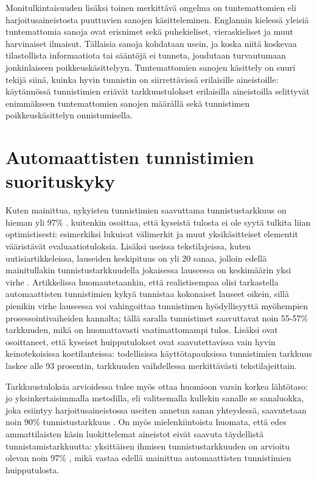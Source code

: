 \documentclass[utf8,bachelor,manualbib]{gradu3}
\begin{document}
Monitulkintaisuuden lisäksi toinen merkittävä ongelma on tuntemattomien eli harjoitusaineistosta puuttuvien sanojen käsitteleminen. Englannin kielessä yleisiä tuntemattomia sanoja ovat erisnimet sekä puhekieliset, vieraskieliset ja muut harvinaiset ilmaisut. Tällaisia sanoja kohdataan usein, ja koska niitä koskevaa tilastollista informaatiota tai sääntöjä ei tunneta, joudutaan turvautumaan jonkinlaiseen poikkeuskäsittelyyn. Tuntemattomien sanojen käsittely on suuri tekijä siinä, kuinka hyvin tunnistin on siirrettävissä erilaisille aineistoille: käytännössä tunnistimien eriävät tarkkuustulokset erilaisilla aineistoilla selittyvät enimmäkseen tuntemattomien sanojen määrällä sekä tunnistimen poikkeuskäsittelyn onnistumisella. \citep[s. 351]{manning1999}  

\section{Automaattisten tunnistimien suorituskyky}

Kuten mainittua, nykyisten tunnistimien saavuttama tunnistustarkkuus on hieman yli 97\%  \citep[mm.][]{spoustova2009, sogaard2011}. \citet{manning2011} kuitenkin osoittaa, että kyseistä tulosta ei ole syytä tulkita liian optimistisesti: esimerkiksi lukuisat välimerkit ja muut yksikäsitteiset elementit vääristävät evaluaatiotuloksia. Lisäksi useissa tekstilajeissa, kuten uutisiartikkeleissa, lauseiden keskipituus on yli 20 sanaa, jolloin edellä mainitullakin tunnistustarkkuudella jokaisessa lauseessa on keskimäärin yksi virhe \citep{manning1999}. Artikkelissa huomautetaankin, että realistisempaa olisi tarkastella automaattisten tunnistimien kykyä tunnistaa kokonaiset lauseet oikein, sillä pienikin virhe lauseessa voi vahingoittaa tunnistimen hyödyllisyyttä myöhempien prosessointivaiheiden kannalta; tällä saralla tunnistimet saavuttavat noin 55-57\% tarkkuuden, mikä on huomattavasti vaatimattomampi tulos. Lisäksi  ovat osoittaneet, että kyseiset huipputulokset ovat saavutettavissa vain hyvin keinotekoisissa koetilanteissa: todellisissa käyttötapauksissa tunnistimien tarkkuus laskee alle 93 prosentin, tarkkuuden vaihdellessa merkittävästi tekstilajeittain.

Tarkkuustuloksia arvioidessa tulee myös ottaa huomioon varsin korkea lähtötaso: jo yksinkertaisimmalla metodilla, eli valitsemalla kullekin sanalle se sanaluokka, joka esiintyy harjoitusaineistossa useiten annetun sanan yhteydessä, saavutetaan noin 90\% tunnistustarkkuus \citep{charniak1993}. On myös mielenkiintoista huomata, että edes ammattilaisten käsin luokittelemat aineistot eivät saavuta täydellistä tunnistamistarkkuutta: yksittäisen ihmisen tunnistustarkkuuden on arvioitu olevan noin 97\% \citep{manning2011}, mikä vastaa edellä mainittua automaattisten tunnistimien huipputulosta.
 
\end{document}
